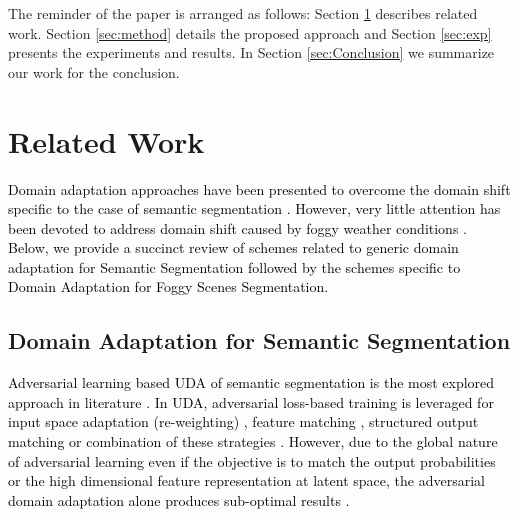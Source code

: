 \documentclass[final,5p,times,twocolumn]{elsarticle}
\begin{document}
\noindent The reminder of the paper is arranged as follows: Section \ref{sec:relatedWork} describes related work. Section \ref{sec:method} details the proposed approach and Section \ref{sec:exp} presents the experiments and results. In Section \ref{sec:Conclusion} we summarize our work for the conclusion.


\section{Related Work}
\label{sec:relatedWork}




\textcolor{black}{
Domain adaptation approaches have been presented to overcome the domain shift specific to the case of semantic segmentation \cite{tsai2018learning, zou2018unsupervised, vu2019advent, mlsl2020}. However, very little attention has been devoted to address domain shift caused by foggy weather conditions \cite{sakaridis2018model, sakaridis2018semantic, dai2019curriculum}. }
\textcolor{black}{Below, we provide a succinct review of schemes related to generic domain adaptation for Semantic Segmentation followed by the schemes specific to Domain Adaptation for Foggy Scenes Segmentation.}

\subsection{Domain Adaptation for Semantic Segmentation}

\textcolor{black}{
Adversarial learning based UDA of semantic segmentation is the most explored approach in literature \cite{kim2020learning, zhang2018fcan, kim2019bidirectional,dlow_2019_CVPR,chen2017road}. In UDA, adversarial loss-based training is leveraged for input space adaptation (re-weighting) \cite{zhang2018fully, hoffman2017cycada}, feature matching \cite{iqbal2020wan,structure_2019_CVPR, chen2017no,mancini2018boosting, sankaranarayanan2018learning}, structured output matching \cite{tsai2018learning, vu2019advent, kim2019bidirectional} or combination of these strategies \cite{kim2019bidirectional, dada_2019_ICCV, zhang2018fcan}. However, due to the global nature of adversarial learning even if the objective is to match the output probabilities or the high dimensional feature representation at latent space, the adversarial domain adaptation alone produces sub-optimal results \cite{vu2019advent, kim2019bidirectional, iqbal2020wan}.} 
\end{document}
